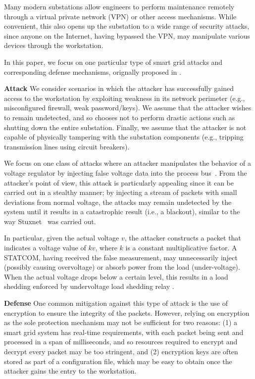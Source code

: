Many modern substations allow engineers to perform maintenance
remotely through a virtual private network (VPN) or other access
mechanisms. While convenient, this also opens up the substation to a
wide range of security attacks, since anyone on the Internet, having
bypassed the VPN, may manipulate various devices through the
workstation.

In this paper, we focus on one particular type of smart grid attacks
and corresponding defense mechanisms, orignally proposed in
\cite{law2012security}.

\noindent\textbf{Attack} We consider scenarios in which the attacker has
successfully gained access to the workstation by exploiting weakness
in its network perimeter (e.g., misconfigured firewall, weak
password/keys). We assume that the attacker wishes to
remain undetected, and so chooses not to perform drastic actions such
as shutting down the entire substation. Finally, we assume that the
attacker is not capable of physically tampering with the substation
components (e.g., tripping transmission lines using circuit breakers).

We focus on one class of attacks where an attacker manipulates the
behavior of a voltage regulator by injecting false voltage data into
the process bus~\cite{law2012security}. From the attacker's point of
view, this attack is particularly appealing since it can be carried
out in a stealthy manner; by injecting a stream of packets with small
deviations from normal voltage, the attacks may remain undetected by
the system until it results in a catastrophic result (i.e., a
blackout), similar to the way Stuxnet~\cite{farwell2011stuxnet} was
carried out.

In particular, given the actual voltage $v$, the attacker constructs a
packet that indicates a voltage value of $kv$, where $k$ is a constant
multiplicative factor. A STATCOM, having received the false
measurement, may unnecessarily inject (possibly causing overvoltage)
or absorb power from the load (under-voltage). When the actual voltage
drops below a certain level, this results in a load shedding enforced
by undervoltage load shedding relay \cite{lefebvre2004undervoltage}.

\noindent\textbf{Defense} One common mitigation against this type of attack
is the use of encryption to ensure the integrity of the
packets. However, relying on encryption as the sole protection
mechanism may not be sufficient for two reasons:
(1) a smart grid system has real-time requirements, with each packet
being sent and processed in a span of milliseconds, and so resources
required to encrypt and decrypt every packet may be too stringent, and
(2) encryption keys are often stored as part of a configuration file,
which may be easy to obtain once the attacker gains the entry to the
workstation. 

